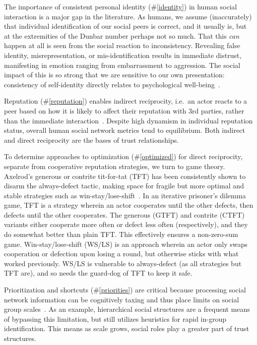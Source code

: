 The importance of consistent personal identity (\#\ref{identity}) in human social interaction is a major gap in the literature.
As humans, we assume (inaccurately) that individual identification of our social peers is correct, and it usually is, but at the extremities of the Dunbar number perhaps not so much.
That this \emph{can} happen at all is seen from the social reaction to inconsistency.
Revealing false identity, misrepresentation, or mis-identification results in immediate distrust, manifesting in emotion ranging from embarrassment to aggression.
The social impact of this is so strong that we are sensitive to our own presentation: consistency of self-identity directly relates to psychological well-being~\cite{suh2002culture}.


Reputation (\#\ref{reputation}) enables indirect reciprocity, i.e.\ an actor reacts to a peer based on how it is likely to affect their reputation with 3rd parties, rather than the immediate interaction~\cite{phelps2012emergence}.
Despite high dynamism in individual reputation status, overall human social network metrics tend to equilibrium.
Both indirect and direct reciprocity are the bases of trust relationships.

To determine approaches to optimization (\#\ref{optimized}) for direct reciprocity, separate from cooperative reputation strategies, we turn to game theory.
Axelrod's generous or contrite tit-for-tat (TFT) has been consistently shown to disarm the always-defect tactic, making space for fragile but more optimal and stable strategies such as win-stay/lose-shift~\cite{axelrod1981evolution, axelrod1997complexity, nowak1995arithmetics}.
In an iterative prisoner's dilemma game, TFT is a strategy wherein an actor cooperates until the other defects, then defects until the other cooperates.
The generous (GTFT) and contrite (CTFT) variants either cooperate more often or defect less often (respectively), and they do somewhat better than plain TFT. This effectively ensures a non-zero-sum game.
Win-stay/lose-shift (WS/LS) is an approach wherein an actor only swaps cooperation or defection upon losing a round, but otherwise sticks with what worked previously.
WS/LS is vulnerable to always-defect (as all strategies but TFT are), and so needs the guard-dog of TFT to keep it safe.

Prioritization and shortcuts (\#\ref{priorities}) are critical because processing social network information can be cognitively taxing and thus place limits on social group scales~\cite{davidbarrett2013processing}.
As an example, hierarchical social structures are a frequent means of bypassing this limitation, but still utilizes heuristics for rapid in-group identification.
This means as scale grows, social roles play a greater part of trust structures.


